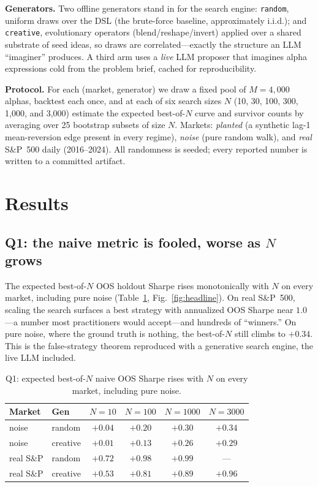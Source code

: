 \documentclass[sigconf,review,anonymous]{acmart}
\begin{document}
\textbf{Generators.} Two offline generators stand in for the search engine: \texttt{random}, uniform draws over the DSL (the brute-force baseline, approximately i.i.d.); and \texttt{creative}, evolutionary operators (blend/reshape/invert) applied over a shared substrate of seed ideas, so draws are correlated---exactly the structure an LLM ``imaginer'' produces. A third arm uses a \emph{live} LLM proposer that imagines alpha expressions cold from the problem brief, cached for reproducibility.

\textbf{Protocol.} For each (market, generator) we draw a fixed pool of $M{=}4{,}000$ alphas, backtest each once, and at each of six search sizes $N$ (10, 30, 100, 300, 1{,}000, and 3{,}000) estimate the expected best-of-$N$ curve and survivor counts by averaging over 25 bootstrap subsets of size $N$. Markets: \emph{planted} (a synthetic lag-1 mean-reversion edge present in every regime), \emph{noise} (pure random walk), and \emph{real} S\&P~500 daily (2016--2024). All randomness is seeded; every reported number is written to a committed artifact.

\section{Results}
\subsection{Q1: the naive metric is fooled, worse as $N$ grows}
The expected best-of-$N$ OOS holdout Sharpe rises monotonically with $N$ on every market, including pure noise (Table~\ref{tab:q1}, Fig.~\ref{fig:headline}). On real S\&P~500, scaling the search surfaces a best strategy with annualized OOS Sharpe near $1.0$---a number most practitioners would accept---and hundreds of ``winners.'' On pure noise, where the ground truth is nothing, the best-of-$N$ still climbs to $+0.34$. This is the false-strategy theorem reproduced with a generative search engine, the live LLM included.

\begin{table}[t]
\caption{Q1: expected best-of-$N$ naive OOS Sharpe rises with $N$ on every market, including pure noise.}
\label{tab:q1}
\small
\begin{tabular}{@{}llcccc@{}}
\toprule
Market & Gen & $N{=}10$ & $N{=}100$ & $N{=}1000$ & $N{=}3000$ \\
\midrule
noise & random & $+0.04$ & $+0.20$ & $+0.30$ & $+0.34$ \\
noise & creative & $+0.01$ & $+0.13$ & $+0.26$ & $+0.29$ \\
real S\&P & random & $+0.72$ & $+0.98$ & $+0.99$ & --- \\
real S\&P & creative & $+0.53$ & $+0.81$ & $+0.89$ & $+0.96$ \\
\bottomrule
\end{tabular}
\end{table}
\end{document}
